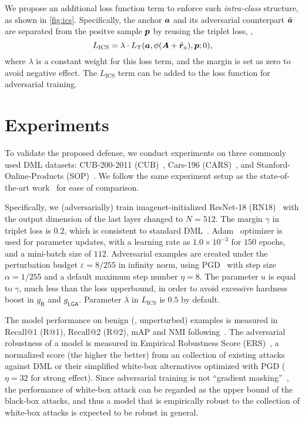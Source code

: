 \documentclass[10pt,twocolumn,letterpaper]{article}
\begin{document}

We propose an additional loss function term to enforce such \emph{intra-class}
structure, as shown in \cref{fig:ics}.
%
Specifically, the anchor ${\bm{a}}$ and its adversarial counterpart $\tilde{{\bm{a}}}$
are separated from the positve sample ${\bm{p}}$ by reusing the triplet loss,
\ie,
%
\begin{equation}
	L_\text{ICS} = \lambda \cdot L_\text{T}(
	{\bm{a}}, \phi({\bm{A}} + \hat{{\bm{r}}}_a), {\bm{p}}; 0),
\end{equation}
%
where $\lambda$ is a constant weight for this loss term,
and the margin is set as zero to avoid negative effect.
%
The $L_\text{ICS}$ term can be added to the loss function for
adversarial training.

\section{Experiments}
\label{sec:4}


To validate the proposed defense, we conduct experiments
on three commonly used DML datasets: CUB-200-2011 (CUB)~\cite{cub200}, Cars-196
(CARS)~\cite{cars196}, and Stanford-Online-Products (SOP)~\cite{sop}.
%
We follow the same experiment setup as the state-of-the-art work~\cite{robrank}
for ease of comparison.




Specifically, we (adversarially) train imagenet-initialized ResNet-18
(RN18)~\cite{resnet} with the output dimension of the last layer changed to
$N{=}512$.
%
The margin $\gamma$ in triplet loss is $0.2$, which is consistent to standard
DML~\cite{revisiting}.
%
Adam~\cite{adam} optimizer is used for parameter updates, with a learning rate
as $1.0{\times}10^{-3}$ for $150$ epochs, and a mini-batch size of $112$.
%
Adversarial examples are created under the perturbation budget
$\varepsilon{=}8/255$ in infinity norm, using PGD~\cite{madry} with step size
$\alpha{=}1/255$ and a default maximum step number $\eta{=}8$.
%
The parameter $u$ is equal to $\gamma$, much less than the loss upperbound,
in order to avoid excessive hardness boost in $g_\mathsf{B}$ and $g_\mathsf{LGA}$.
%
Parameter $\lambda$ in $L_\text{ICS}$ is $0.5$ by default.

The model performance on benign (\ie, unperturbed) examples is measured in
Recall@1 (R@1), Recall@2 (R@2), mAP and NMI
following~\cite{revisiting,robrank}.
%
The adversarial robustness of a model is measured in Empirical Robustness Score
(ERS)~\cite{robrank}, a normalized score (the higher the better) from
an collection of existing attacks against DML or their simplified white-box
alternatives optimized with PGD ($\eta=32$ for strong effect).
%
Since adversarial training is not ``gradient masking''~\cite{obfuscated}, the
performance of white-box attack can be regarded as the upper bound of the
black-box attacks, and thus a model that is empirically robust to the collection
of white-box attacks is expected to be robust in general.
\end{document}
